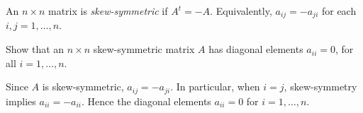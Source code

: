 \documentclass{ximera}
\begin{document}
\begin{definition} \rm \label{D:skew_symmetric}
An $n\times n$ matrix is {\em skew-symmetric} if $A^t = -A$. Equivalently, $a_{ij} = -a_{ji}$ for each $i,j = 1,\ldots,n$.
\end{definition}


\begin{exercise} \label{YZ_1.3_skewsym1}
Show that an $n\times n$ skew-symmetric matrix $A$ has diagonal elements $a_{ii}=0$, for all $i=1,\ldots,n$.

\begin{solution}
\soln Since $A$ is skew-symmetric, $a_{ij} = -a_{ji}$. In particular, when $i = j$, skew-symmetry implies $a_{ii} = -a_{ii}$. Hence the diagonal elements $a_{ii} = 0$ for $i=1,\ldots, n$.
\end{solution}
\end{exercise}
\end{document}
